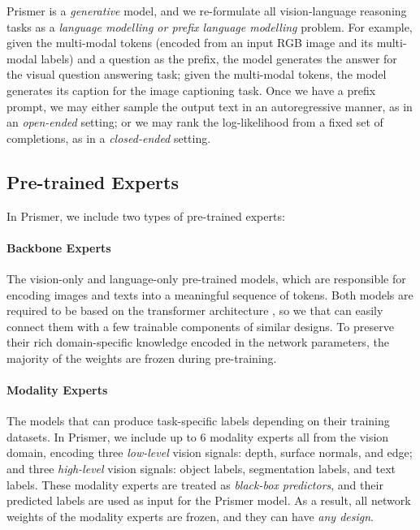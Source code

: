 \documentclass[11pt]{article}
\begin{document}
Prismer is a {\it generative} model, and we re-formulate all vision-language reasoning tasks as a {\it language modelling or prefix language modelling} problem. For example, given the multi-modal tokens (encoded from an input RGB image and its multi-modal labels) and a question as the prefix, the model generates the answer for the visual question answering task; given the multi-modal tokens, the model generates its caption for the image captioning task. Once we have a prefix prompt, we may either sample the output text in an autoregressive manner, as in an {\it open-ended} setting; or we may rank the log-likelihood from a fixed set of completions, as in a {\it closed-ended} setting.


\subsection{Pre-trained Experts}
\label{sec:experts}
In Prismer, we include two types of pre-trained experts:

\paragraph{Backbone Experts} The vision-only and language-only pre-trained models, which are responsible for encoding images and texts into a meaningful sequence of tokens. Both models are required to be based on the transformer architecture \cite{vaswani2017transformer}, so we that can easily connect them with a few trainable components of similar designs. To preserve their rich domain-specific knowledge encoded in the network parameters, the majority of the weights are frozen during pre-training.
  
\paragraph{Modality Experts} The models that can produce task-specific labels depending on their training datasets. In Prismer, we include up to 6 modality experts all from the vision domain, encoding three {\it low-level} vision signals: depth, surface normals, and edge; and three {\it high-level} vision signals: object labels, segmentation labels, and text labels. These modality experts are treated as {\it black-box predictors}, and their predicted labels are used as input for the Prismer model. As a result, all network weights of the modality experts are frozen, and they can have {\it any design}.
\end{document}
